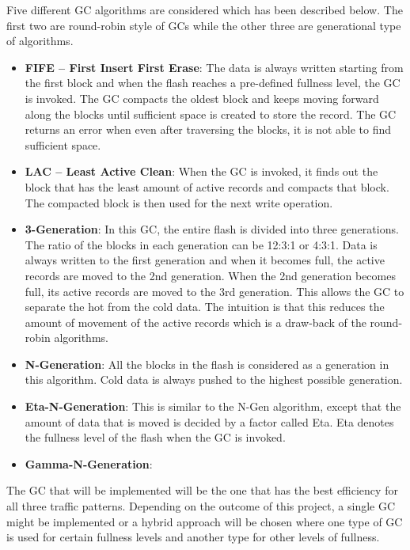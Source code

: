 Five different GC algorithms are considered which has been described below. The first two are round-robin style of GCs while the other three are generational type of algorithms.
\begin{itemize}
\item {\bf FIFE – First Insert First Erase}:
The data is always written starting from the first block and when the flash reaches a pre-defined fullness level, the GC is invoked. The GC compacts the oldest block and keeps moving forward along the blocks until sufficient space is created to store the record. The GC returns an error when even after traversing the blocks, it is not able to find sufficient space. 
\item {\bf LAC – Least Active Clean}:
When the GC is invoked, it finds out the block that has the least amount of active records and compacts that block. The compacted block is then used for the next write operation.
\item {\bf 3-Generation}:
In this GC, the entire flash is divided into three generations. The ratio of the blocks in each generation can be 12:3:1 or 4:3:1. Data is always written to the first generation and when it becomes full, the active records are moved to the 2nd generation. When the 2nd generation becomes full, its active records are moved to the 3rd generation. This allows the GC to separate the hot from the cold data. The intuition is that this reduces the amount of movement of the active records which is a draw-back of the round-robin algorithms.
\item {\bf N-Generation}:
All the blocks in the flash is considered as a generation in this algorithm. Cold data is always pushed to the highest possible generation.
\item {\bf Eta-N-Generation}:
This is similar to the N-Gen algorithm, except that the amount of data that is moved is decided by a factor called Eta. Eta denotes the fullness level of the flash when the GC is invoked.
\item {\bf Gamma-N-Generation}:
\end{itemize}	

The GC that will be implemented will be the one that has the best efficiency for all three traffic patterns. Depending on the outcome of this project, a single GC might be implemented or a hybrid approach will be chosen where one type of GC is used for certain fullness levels and another type for other levels of fullness.

